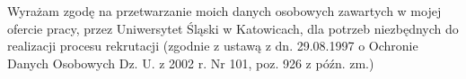 \documentclass[10pt,a4paper]{moderncv}
\begin{document}



%
%
\closesection{}
\footnotesize{}
Wyrażam zgodę na przetwarzanie moich danych osobowych zawartych w mojej ofercie pracy, przez Uniwersytet Śląski w Katowicach, dla potrzeb niezbędnych do realizacji procesu rekrutacji (zgodnie z ustawą z dn. 29.08.1997 o Ochronie Danych Osobowych Dz. U. z 2002 r. Nr 101,
poz. 926 z późn. zm.)
\end{document}
